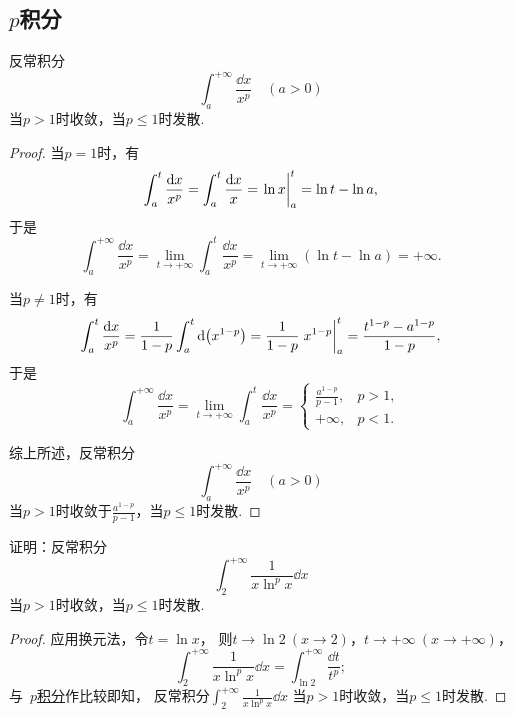 \subsection{\texorpdfstring{\(p\)}{p}积分}
\begin{proposition}[\(p\)积分]\label{example:定积分.p积分}
反常积分\[
	\int_a^{+\infty} \frac{\dd{x}}{x^p}
	\quad(a>0)
\]当\(p>1\)时收敛，当\(p\leq1\)时发散.
\begin{proof}
当\(p=1\)时，有\[
	\int_a^t \frac{\dd{x}}{x^p}
	= \int_a^t \frac{\dd{x}}{x}
	= \eval{\ln x}_a^t
	= \ln t - \ln a,
\]
于是\[
	\int_a^{+\infty} \frac{\dd{x}}{x^p}
	= \lim_{t\to+\infty} \int_a^t \frac{\dd{x}}{x^p}
	= \lim_{t\to+\infty} (\ln t - \ln a)
	= +\infty.
\]

当\(p\neq1\)时，有\[
	\int_a^t \frac{\dd{x}}{x^p}
	= \frac{1}{1-p} \int_a^t \dd(x^{1-p})
	= \frac{1}{1-p} \eval{x^{1-p}}_a^t
	= \frac{t^{1-p}-a^{1-p}}{1-p},
\]
于是\[
	\int_a^{+\infty} \frac{\dd{x}}{x^p}
	= \lim_{t\to+\infty} \int_a^t \frac{\dd{x}}{x^p}
	= \left\{ \begin{array}{cl}
		\frac{a^{1-p}}{p-1}, & p>1, \\
		+\infty, & p<1.
	\end{array} \right.
\]

综上所述，反常积分\[
	\int_a^{+\infty} \frac{\dd{x}}{x^p}
	\quad(a>0)
\]当\(p>1\)时收敛于\(\frac{a^{1-p}}{p-1}\)，当\(p\leq1\)时发散.
\end{proof}
\end{proposition}

\begin{example}
证明：反常积分\[
	\int_2^{+\infty} \frac{1}{x \ln^p x} \dd{x}
\]
当\(p>1\)时收敛，当\(p\leq1\)时发散.
\begin{proof}
应用换元法，令\(t = \ln x\)，
则\(t \to \ln2\ (x\to2)\)，\(t \to +\infty\ (x\to+\infty)\)，
\[
	\int_2^{+\infty} \frac{1}{x \ln^p x} \dd{x}
	= \int_{\ln2}^{+\infty} \frac{\dd{t}}{t^p};
\]
与~\hyperref[example:定积分.p积分]{\(p\)积分}作比较即知，
反常积分\(\int_2^{+\infty} \frac{1}{x \ln^p x} \dd{x}\)%
当\(p>1\)时收敛，当\(p\leq1\)时发散.
\end{proof}
\end{example}

